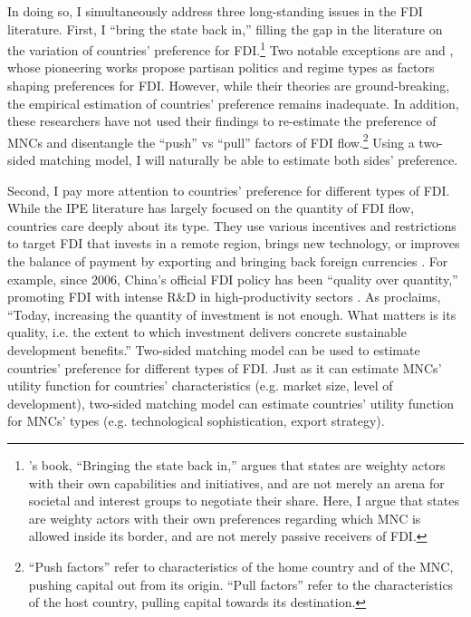 In doing so, I simultaneously address three long-standing issues in the FDI
literature. First, I ``bring the state back in,'' filling the gap in the
literature on the variation of countries' preference for
FDI.\footnote{\citet{Evans1985}'s book, ``Bringing the state back in,'' argues
  that states are weighty actors with their own capabilities and initiatives,
  and are not merely an arena for societal and interest groups to negotiate
  their share. Here, I argue that states are weighty actors with their own
  preferences regarding which MNC is allowed inside its border, and are not
  merely passive receivers of FDI.} Two notable exceptions are \citet{Pinto2013}
and \citet{Pandya2016}, whose pioneering works propose partisan politics and
regime types as factors shaping preferences for FDI. However, while their
theories are ground-breaking, the empirical estimation of countries' preference
remains inadequate. In addition, these researchers have not used their findings
to re-estimate the preference of MNCs and disentangle the ``push'' vs ``pull''
factors of FDI flow.\footnote{``Push factors'' refer to characteristics of the
  home country and of the MNC, pushing capital out from its origin. ``Pull
  factors'' refer to the characteristics of the host country, pulling capital
  towards its destination.} Using a two-sided matching model, I will naturally
be able to estimate both sides' preference.

Second, I pay more attention to countries' preference for different types of
FDI. While the IPE literature has largely focused on the quantity of FDI flow,
countries care deeply about its type. They use various incentives and
restrictions to target FDI that invests in a remote region, brings new
technology, or improves the balance of payment by exporting and bringing back
foreign currencies \citep{Ricupero2000}. For example, since 2006, China's
official FDI policy has been ``quality over quantity,'' promoting FDI with
intense R\&D in high-productivity sectors \citep{Guangzhou2011}. As
\citet{UNCTAD2015} proclaims, ``Today, increasing the quantity of investment is
not enough. What matters is its quality, i.e. the extent to which investment
delivers concrete sustainable development benefits.'' Two-sided matching model
can be used to estimate countries' preference for different types of FDI. Just
as it can estimate MNCs' utility function for countries' characteristics (e.g.
market size, level of development), two-sided matching model can estimate
countries' utility function for MNCs' types (e.g. technological sophistication,
export strategy).

